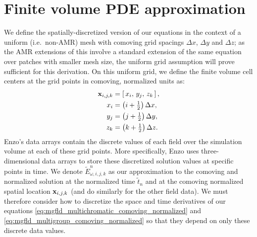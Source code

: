 \documentclass[10pt]{article}
\renewcommand{\(}{\left(}
\renewcommand{\)}{\right)}
\newcommand{\xvec}{{\bf x}}
\newcommand{\tT}{\tilde{t}}
\newcommand{\tE}{\tilde{E}}
\begin{document}
\section{Finite volume PDE approximation}
\label{sec:fv_approximation}

We define the spatially-discretized version of our equations in the
context of a uniform (i.e.~non-AMR) mesh with comoving grid spacings $\Delta x$,
$\Delta y$ and $\Delta z$; as the AMR extensions of this involve a
standard extension of the same equation over patches with smaller mesh
size, the uniform grid assumption will prove sufficient for this
derivation.  On this uniform grid, we define the finite volume cell
centers at the grid points in comoving, normalized units as: 
\begin{align*}
   \xvec_{i,j,k} &= \left[\,x_i,\,  y_j,\, z_k\,\right], \\
   x_i &= \left(i + \tfrac12\right) \Delta x, \\
   y_j &= \left(j + \tfrac12\right) \Delta y, \\
   z_k &= \left(k + \tfrac12\right) \Delta z.
\end{align*}
Enzo's data arrays contain the discrete values of each field over the
simulation volume at each of these grid points.  More specifically,
Enzo uses three-dimensional data arrays to store these discretized
solution values at specific points in time.  We denote $\tE^n_{\omega,i,j,k}$
as our approximation to the comoving and normalized solution at the
normalized time $\tT_{n}$ and at the comoving normalized spatial
location $\xvec_{i,j,k}$ (and do similarly for the other field data).
We must therefore consider how to discretize the space and time
derivatives of our equations
\eqref{eq:mgfld_multichromatic_comoving_normalized} and 
\eqref{eq:mgfld_multigroup_comoving_normalized}
so that they depend on only these discrete data values.
\end{document}
